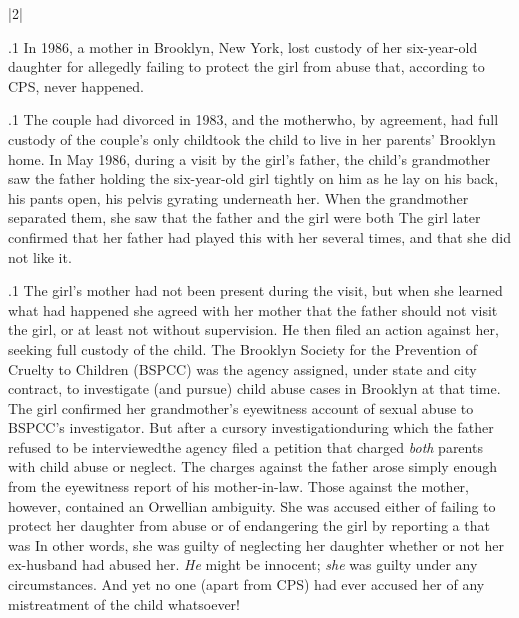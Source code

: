 \documentclass[11pt, twoside]{article}
\begin{document}
{{}%


\s|2|{ }

\p.1{%
\noindent{}In 1986, a mother in Brooklyn, New York, lost custody
of her six-year-old daughter for allegedly failing to protect the girl from abuse that,
according to CPS, never happened.
}%

\p.1{%
The couple had divorced in 1983, and the mother\mdash{}who, by agreement, had full custody of the couple's only child\mdash{}took the child to live
in her parents' Brooklyn home. In May 1986, during a visit by the girl's
father, the child's grandmother saw the father holding the six-year-old
girl tightly on him as he lay on his back, his pants open, his pelvis gyrating underneath her. When the grandmother separated them, she saw
that the father and the girl were both  The girl later confirmed that
her father had played this  with her several times, and that she
did not like it.
}%

\p.1{%
The girl's mother had not been present during the visit, but when she
learned what had happened she agreed with her mother that the father
should not visit the girl, or at least not without supervision. He then filed
an action against her, seeking full custody of the child.
The Brooklyn Society for the Prevention of Cruelty to Children
(BSPCC) was the agency assigned, under state and city contract, to
investigate (and pursue) child abuse cases in Brooklyn at that time.
The girl confirmed her grandmother's eyewitness account of sexual
abuse to BSPCC's investigator. But after a cursory investigation\mdash{}during
which the father refused to be interviewed\mdash{}the agency filed a petition
that charged \textit{both} parents with child abuse or neglect. The charges
against the father arose simply enough from the eyewitness report of
his mother-in-law. Those against the mother, however, contained an
Orwellian ambiguity. She was accused either of failing to protect her
daughter from abuse or of endangering the girl by reporting a 
that was  In other words, she was guilty of neglecting
her daughter whether or not her ex-husband had abused her. \textit{He} might
be innocent; \textit{she} was guilty under any circumstances. And yet no one
(apart from CPS) had ever accused her of any mistreatment of the child
whatsoever!
}%

}
\end{document}
